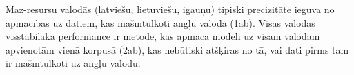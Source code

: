 Maz-resursu valodās (latviešu, lietuviešu, igauņu) tipiski precizitāte ieguva no apmācības uz datiem, kas mašīntulkoti angļu valodā (1ab). Visās valodās visstabilākā performance ir metodē, kas apmāca modeli uz visām valodām apvienotām vienā korpusā (2ab), kas nebūtiski atšķiras no tā, vai dati pirms tam ir mašīntulkoti uz angļu valodu.



